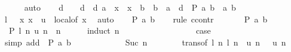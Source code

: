 \begin{isabellebody}
\ \ \ \ \isamarkupfalse%
\ auto\isanewline
\ \ \isamarkupfalse%
\ d\ \ {\isachardoublequoteopen}{}\ {\isacharless}{\kern0pt}\ d{\isachardoublequoteclose}\ \ d{\isacharcolon}{\kern0pt}\ {\isachardoublequoteopen}a\ {\isasymle}\ x\ {\isasymLongrightarrow}\ x\ {\isasymle}\ b\ {\isasymLongrightarrow}\ b\ {\isacharminus}{\kern0pt}\ a\ {\isacharless}{\kern0pt}\ d\ {\isasymLongrightarrow}\ P\ a\ b{\isachardoublequoteclose}\ \ a\ b\isanewline
\ \ \ \ \isamarkupfalse%
\ {\isacartoucheopen}l\ {}\ {\isasymle}\ x{\isacartoucheclose}\ {\isacartoucheopen}x\ {\isasymle}\ u\ {}{\isacartoucheclose}\ local{\isacharbrackleft}{\kern0pt}of\ x{\isacharbrackright}{\kern0pt}\ \isamarkupfalse%
\ auto\isanewline
\isanewline
\ \ \isamarkupfalse%
\ {\isachardoublequoteopen}P\ a\ b{\isachardoublequoteclose}\isanewline
\ \ \isamarkupfalse%
\ {\isacharparenleft}{\kern0pt}rule\ ccontr{\isacharparenright}{\kern0pt}\isanewline
\ \ \ \ \isamarkupfalse%
\ {\isachardoublequoteopen}{\isasymnot}\ P\ a\ b{\isachardoublequoteclose}\isanewline
\ \ \ \ \isamarkupfalse%
\ {\isachardoublequoteopen}{\isasymnot}\ P\ {\isacharparenleft}{\kern0pt}l\ n{\isacharparenright}{\kern0pt}\ {\isacharparenleft}{\kern0pt}u\ n{\isacharparenright}{\kern0pt}{\isachardoublequoteclose}\ \ n\isanewline
\ \ \ \ \isamarkupfalse%
\ {\isacharparenleft}{\kern0pt}induct\ n{\isacharparenright}{\kern0pt}\isanewline
\ \ \ \ \ \ \isamarkupfalse%
\ {}\isanewline
\ \ \ \ \ \ \isamarkupfalse%
\ \isamarkupfalse%
\ {\isacharquery}{\kern0pt}case\isanewline
\ \ \ \ \ \ \ \ \isamarkupfalse%
\ {\isacharparenleft}{\kern0pt}simp\ add{\isacharcolon}{\kern0pt}\ {\isacartoucheopen}{\isasymnot}\ P\ a\ b{\isacartoucheclose}{\isacharparenright}{\kern0pt}\isanewline
\ \ \ \ \isamarkupfalse%
\isanewline
\ \ \ \ \ \ \isamarkupfalse%
\ {\isacharparenleft}{\kern0pt}Suc\ n{\isacharparenright}{\kern0pt}\isanewline
\ \ \ \ \ \ \isamarkupfalse%
\ trans{\isacharbrackleft}{\kern0pt}of\ {\isachardoublequoteopen}l\ n{\isachardoublequoteclose}\ {\isachardoublequoteopen}{\isacharparenleft}{\kern0pt}l\ n\ {\isacharplus}{\kern0pt}\ u\ n{\isacharparenright}{\kern0pt}\ {\isacharslash}{\kern0pt}\ {}{\isachardoublequoteclose}\ {\isachardoublequoteopen}u\ n{\isachardoublequoteclose}{\isacharbrackright}{\kern0pt}\ \isamarkupfalse%

\end{isabellebody}
